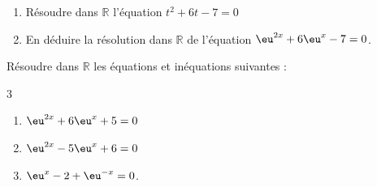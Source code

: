 \documentclass[main.tex]{subfiles}
\begin{document}
\begin{exercise} \hfill 
	\vspace{0.25em}
\begin{enumerate}[leftmargin=*,label={\arabic*)}]
	\item Résoudre dans $\mathbb{R}$ l'équation $t^2+6t-7=0$
	\item En déduire la résolution dans $\mathbb{R}$ de l'équation $\eu^{2x}+6\eu^x-7=0$.
\end{enumerate} 
\end{exercise}
\begin{exercise}\label{chapter06:exercice:exp:equations3} Résoudre dans $\mathbb{R}$ les équations et inéquations suivantes :  
	\vspace{-0.25em}
\begin{multicols}{3}
	\begin{enumerate}[label={$(E_{\arabic*})$}, leftmargin=*]
		\item $\eu^{2x}+6\eu^x+5=0$
		\item $\eu^{2x}-5\eu^x+6=0$
		\item $\eu^{x}-2+\eu^{-x}=0$.
	\end{enumerate}
\end{multicols} \vspace{-0.25em}
\end{exercise}
\end{document}
